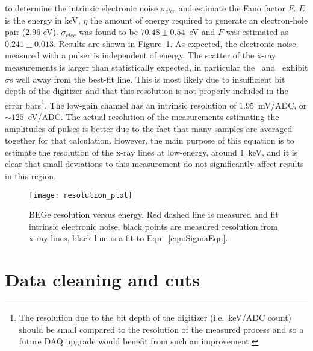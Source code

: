 to determine the intrinsic electronic noise $\sigma_{elec}$ and estimate the Fano factor $F$.  $E$ is the energy in keV, $\eta$ the amount of energy required to generate an electron-hole pair (2.96 eV).  $\sigma_{elec}$ was found to be $70.48\pm0.54$~eV and $F$ was estimated as $0.241\pm0.013$.  Results are shown in Figure~\ref{fig:BeGeResPlot}.  As expected, the electronic noise measured with a pulser is independent of energy.  The scatter of the x-ray measurements is larger than statistically expected, in particular the \znsixfive~and \galsixeight~exhibit $\sigma$s well away from the best-fit line.  This is most likely due to insufficient bit depth of the digitizer and that this resolution is not properly included in the error bars\footnote{The resolution due to the bit depth of the digitizer (i.e.~keV/ADC count) should be small compared to the resolution of the measured process and so a future DAQ upgrade would benefit from such an improvement.}.  The low-gain channel has an intrinsic resolution of 1.95~mV/ADC, or $\sim125$~eV/ADC.  The actual resolution of the measurements estimating the amplitudes of pulses is better due to the fact that many samples are averaged together for that calculation.  However, the main purpose of this equation is to estimate the resolution of the x-ray lines at low-energy, around 1~keV, and it is clear that small deviations to this measurement do not significantly affect results in this region.

			\begin{figure}
				\centering
				\texttt{[image: resolution\_plot]}
				\caption[BeGe resolution versus energy]
				{BEGe resolution versus energy.  Red dashed line is measured and fit intrinsic electronic noise, 
				black points are measured resolution from x-ray lines, black line is a fit to Eqn.~\ref{eqn:SigmaEqn}.}
				\label{fig:BeGeResPlot}
			\end{figure}





	\section{Data cleaning and cuts}
	\label{sec:BeGeCuts}	
	
